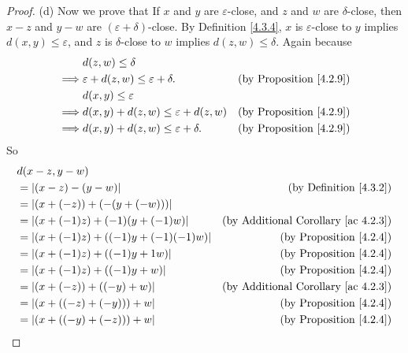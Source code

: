 \begin{proof}{(d)}
    Now we prove that If \(x\) and \(y\) are \(\varepsilon\)-close, and \(z\) and \(w\) are \(\delta\)-close, then \(x - z\) and \(y - w\) are \((\varepsilon + \delta)\)-close.
    By Definition \ref{4.3.4}, \(x\) is \(\varepsilon\)-close to \(y\) implies \(d(x, y) \leq \varepsilon\), and \(z\) is \(\delta\)-close to \(w\) implies \(d(z, w) \leq \delta\).
    Again because
    \begin{align*}
                 & d(z, w) \leq \delta                                                                    \\
        \implies & \varepsilon + d(z, w) \leq \varepsilon + \delta. & \text{(by Proposition \ref{4.2.9})} \\
                 & d(x, y) \leq \varepsilon                                                               \\
        \implies & d(x, y) + d(z, w) \leq \varepsilon + d(z, w)     & \text{(by Proposition \ref{4.2.9})} \\
        \implies & d(x, y) + d(z, w) \leq \varepsilon + \delta.     & \text{(by Proposition \ref{4.2.9})}
    \end{align*}
    So
    \begin{align*}
         & d(x - z, y - w)                                                                               \\
         & = \abs*{(x - z) - (y - w)}                  & \text{(by Definition \ref{4.3.2})}              \\
         & = \abs*{(x + (-z)) + (-(y + (-w)))}                                                           \\
         & = \abs*{(x + (-1)z) + (-1)(y + (-1)w)}      & \text{(by Additional Corollary \ref{ac 4.2.3})} \\
         & = \abs*{(x + (-1)z) + ((-1)y + (-1)(-1)w)}  & \text{(by Proposition \ref{4.2.4})}             \\
         & = \abs*{(x + (-1)z) + ((-1)y + 1w)}         & \text{(by Proposition \ref{4.2.4})}             \\
         & = \abs*{(x + (-1)z) + ((-1)y + w)}          & \text{(by Proposition \ref{4.2.4})}             \\
         & = \abs*{(x + (-z)) + ((-y) + w)}            & \text{(by Additional Corollary \ref{ac 4.2.3})} \\
         & = \abs*{(x + ((-z) + (-y))) + w}            & \text{(by Proposition \ref{4.2.4})}             \\
         & = \abs*{(x + ((-y) + (-z))) + w}            & \text{(by Proposition \ref{4.2.4})}             \\

\end{align*}
\end{proof}
